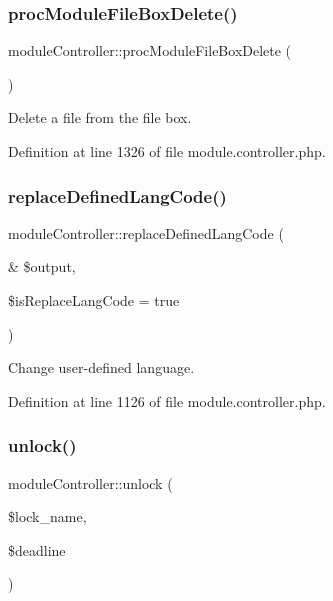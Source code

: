\subsubsection{\texorpdfstring{proc\+Module\+File\+Box\+Delete()}{procModuleFileBoxDelete()}}
{\footnotesize\ttfamily module\+Controller\+::proc\+Module\+File\+Box\+Delete (\begin{DoxyParamCaption}{ }\end{DoxyParamCaption})}



Delete a file from the file box. 



Definition at line 1326 of file module.\+controller.\+php.

\hypertarget{classmoduleController_ace764298e1aee4006ecd8dbf7aaf4007}{}\label{classmoduleController_ace764298e1aee4006ecd8dbf7aaf4007} 
\subsubsection{\texorpdfstring{replace\+Defined\+Lang\+Code()}{replaceDefinedLangCode()}}
{\footnotesize\ttfamily module\+Controller\+::replace\+Defined\+Lang\+Code (\begin{DoxyParamCaption}\item[{\&}]{\$output,  }\item[{}]{\$is\+Replace\+Lang\+Code = {\ttfamily true} }\end{DoxyParamCaption})}



Change user-\/defined language. 



Definition at line 1126 of file module.\+controller.\+php.

\hypertarget{classmoduleController_a79a5d8ecb0bc6186756e80144cbca92f}{}\label{classmoduleController_a79a5d8ecb0bc6186756e80144cbca92f} 
\subsubsection{\texorpdfstring{unlock()}{unlock()}}
{\footnotesize\ttfamily module\+Controller\+::unlock (\begin{DoxyParamCaption}\item[{}]{\$lock\+\_\+name,  }\item[{}]{\$deadline }\end{DoxyParamCaption})}



